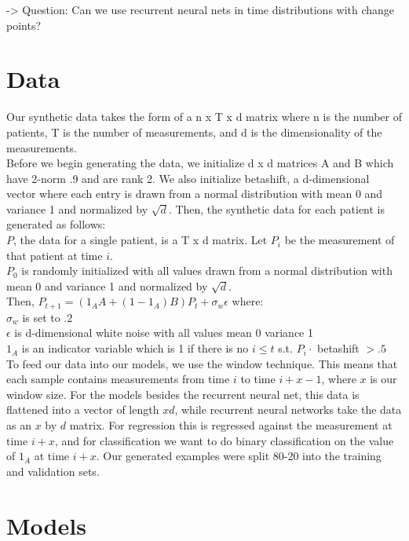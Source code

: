 \documentclass[12pt,a4paper]{article}
\begin{document}
-> Question: Can we use recurrent neural nets in time distributions with change points?  

\section{Data}
Our synthetic data takes the form of a n x T x d matrix where n is the number of patients, T is the number of measurements, and d is the dimensionality of the measurements.  \\

Before we begin generating the data, we initialize d x d matrices A and B which have 2-norm .9 and are rank 2.  We also initialize betashift, a d-dimensional vector where each entry is drawn from a normal distribution with mean 0 and variance 1 and normalized by $\sqrt{d}$.  Then, the synthetic data for each patient is generated as follows:\\

$P$, the data for a single patient, is a T x d matrix.  Let $P_i$ be the measurement of that patient at time $i$.  \\
$P_0$ is randomly initialized with all values drawn from a normal distribution with mean 0 and variance 1 and normalized by $\sqrt{d}$. \\
Then, $P_{t+1} = (1_AA+(1-1_A)B)P_{t} + \sigma_w \epsilon$ where: \\

$\sigma_w$ is set to .2 \\

$\epsilon$ is d-dimensional white noise with all values mean 0 variance 1\\

$1_A$ is an indicator variable which is 1 if there is no $i \leq t$ s.t. $P_i \cdot $ betashift $> .5$\\

To feed our data into our models, we use the window technique.  This means that each sample contains measurements from time $i$ to time $i + x - 1$, where $x$ is our window size.  For the models besides the recurrent neural net, this data is flattened into a vector of length $xd$, while recurrent neural networks take the data as an $x$ by $d$ matrix.  For regression this is regressed against the measurement at time $i + x$, and for classification we want to do binary classification on the value of $1_A$ at time $i + x$.  Our generated examples were split 80-20 into the training and validation sets.  

\section{Models}
\end{document}
